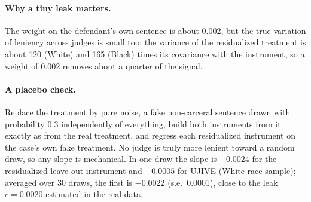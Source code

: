 \documentclass[11pt]{article}
\begin{document}
\paragraph{Why a tiny leak matters.} The weight on the defendant's own sentence is about 0.002, but the true variation of leniency across judges is small too: the variance of the residualized treatment is about 120 (White) and 165 (Black) times its covariance with the instrument, so a weight of 0.002 removes about a quarter of the signal.

\paragraph{A placebo check.} Replace the treatment by pure noise, a fake non-carceral sentence drawn with probability 0.3 independently of everything, build both instruments from it exactly as from the real treatment, and regress each residualized instrument on the case's own fake treatment. No judge is truly more lenient toward a random draw, so any slope is mechanical. In one draw the slope is $-0.0024$ for the residualized leave-out instrument and $-0.0005$ for UJIVE (White race sample); averaged over 30 draws, the first is $-0.0022$ (s.e.\ 0.0001), close to the leak $c = 0.0020$ estimated in the real data.
\end{document}
